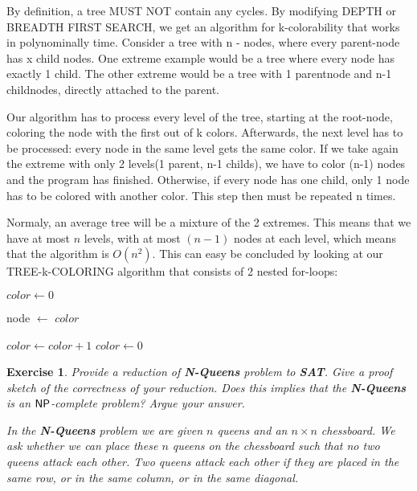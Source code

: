 \documentclass [11pt]{article}
\newtheorem{exercise}[theorem]{Exercise}
\newcommand{\ccfont}[1]{\protect\mathsf{#1}}
\newcommand{\NP}{\ccfont{NP}}
\newcommand{\solution}[1]{\noindent {\bf Solution.}  #1}
\begin{document}
\solution

By definition, a tree MUST NOT contain any cycles. By modifying DEPTH or BREADTH FIRST SEARCH, we get an algorithm for k-colorability that works in polynominally time. Consider a tree with n - nodes, where every parent-node has x child nodes. One extreme example would be a tree where every node has exactly 1 child. The other extreme would be a tree with 1 parentnode and n-1 childnodes, directly attached to the parent.

Our algorithm has to process every level of the tree, starting at the root-node, coloring the node with the first out of k colors. Afterwards, the next level has to be processed: every node in the same level gets the same color. If we take again the extreme with only 2 levels(1 parent, n-1 childs), we have to color (n-1) nodes and the program has finished. Otherwise, if every node has one child, only 1 node has to be colored with another color. This step then must be repeated n times.

Normaly, an average tree will be a mixture of the 2 extremes. This means that we have at most $n$ levels, with at most $(n-1)$ nodes at each level, which means that the algorithm is $O(n^2)$. This can easy be concluded by looking at our TREE-k-COLORING algorithm that consists of 2 nested for-loops:

\medskip

\begin{algorithmic}
  \State $color\gets 0$
  
   \State node $\gets$ $color$
 
\EndFor
        \State $color\gets color+1$
    \Else
            \State $color\gets 0$
    \EndIf
\EndFor
\EndFunction
\end{algorithmic}


\begin{exercise}
  \label{ex:Nqueens}
  Provide a reduction of \textbf{N-Queens} problem to \textbf{SAT}. Give a proof sketch of the correctness of your reduction. Does this implies that the \textbf{N-Queens} is an $\NP$-complete problem? Argue your answer.  
  
  \smallskip 
  
\noindent In the \textbf{N-Queens} problem we are given $n$ queens and an $n \times n$ chessboard. We ask whether we can place these $n$ queens on the  chessboard such that no two queens attack each other. Two queens attack each other if they are placed in the same row, or in the same column, or in the same diagonal.    
       
   
\end{exercise}
\end{document}
